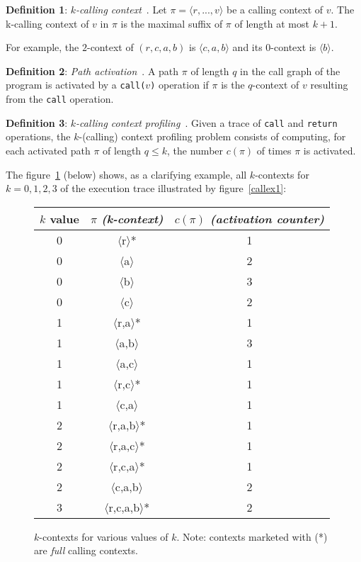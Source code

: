 \documentclass[a4paper,10pt]{report}
\begin{document}
\textbf{Definition 1}: \emph{$k$-calling context}~\cite{kccf}.
Let $\pi = \langle r,...,v\rangle$ be a calling context of $v$. The k-calling context of $v$
in $\pi$ is the maximal suffix of $\pi$ of length at most $k+1$.

For example, the $2$-context of $(r,c,a,b)$ is $\langle c,a,b\rangle$ and its $0$-context is $\langle b\rangle$.

\textbf{Definition 2}: \emph{Path activation}~\cite{kccf}.
A path $\pi$ of length $q$ in the call graph of the program is activated by
a \texttt{call(}$v$\texttt{)}
operation if $\pi$ is the $q$-context of $v$ resulting from the \texttt{call} operation.

\textbf{Definition 3}: \emph{$k$-calling context profiling}~\cite{kccf}. Given a trace
of \texttt{call} and \texttt{return} operations, the $k$-(calling) context
profiling problem consists of computing, for each activated path $\pi$ of length $q\le k$, the number $c(\pi)$ of times $\pi$ is activated.

The figure~\ref{kctx1} (below) shows, as a clarifying example, all $k$-contexts for $k=0,1,2,3$ of the execution trace illustrated by figure~\ref{callex1}:

\begin{figure}[h]
\begin{center}
\begin{tabular}{c|c|c}
$k$ value & \textbf{$\pi$} \emph{(k-context)} & $c(\pi)$ \emph{(activation counter)}\\
\hline
0 & $\langle$r$\rangle$* & 1\\
0 & $\langle$a$\rangle$ & 2\\
0 & $\langle$b$\rangle$ & 3\\
0 & $\langle$c$\rangle$ & 2\\
\hline
1 & $\langle$r,a$\rangle$* & 1\\
1 & $\langle$a,b$\rangle$ & 3\\
1 & $\langle$a,c$\rangle$ & 1\\
1 & $\langle$r,c$\rangle$* & 1\\
1 & $\langle$c,a$\rangle$ & 1\\
\hline
2 & $\langle$r,a,b$\rangle$* & 1\\
2 & $\langle$r,a,c$\rangle$* & 1\\
2 & $\langle$r,c,a$\rangle$* & 1\\
2 & $\langle$c,a,b$\rangle$ & 2\\
\hline
3 & $\langle$r,c,a,b$\rangle$* & 2\\

\end{tabular}
\end{center}
\caption{$k$-contexts for various values of $k$.
Note: contexts marketed with (*) are \emph{full} calling contexts.}
\label{kctx1}
\end{figure}
\end{document}
